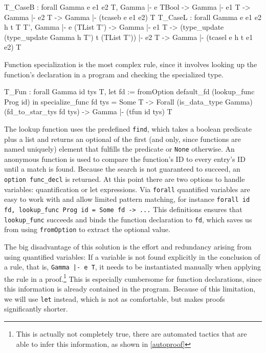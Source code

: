 \documentclass[fleqn]{scrreprt}
\newcommand{\coqinline}[1]{\texttt{#1}}
\begin{document}
\begin{coqcode}
T_CaseB : forall Gamma e e1 e2 T,
            Gamma |- e \in TBool -> Gamma |- e1 \in T -> Gamma |- e2 \in T ->
            Gamma |- (tcaseb e e1 e2) \in T
T_CaseL : forall Gamma e e1 e2 h t T T',
            Gamma |- e \in (TList T') -> Gamma |- e1 \in T ->
            (type_update (type_update Gamma h T') t (TList T')) |- e2 \in T ->
            Gamma |- (tcasel e h t e1 e2) \in T
\end{coqcode}
Function specialization is the most complex rule, since it involves looking up the function's declaration in a program and checking the specialized type.
\begin{coqcode}
T_Fun : forall Gamma id tys T,
          let fd := fromOption default_fd (lookup_func Prog id) in 
          specialize_func fd tys = Some T ->
          Forall (is_data_type Gamma) (fd_to_star_tys fd tys) ->
          Gamma |- (tfun id tys) \in T
\end{coqcode}
The lookup function uses the predefined \coqinline{find}, which takes a boolean predicate plus a list and returns an optional of the first (and only, since functions are named uniquely) element that fulfills the predicate or \coqinline{None} otherwise. An anonymous function is used to compare the function's ID to every entry's ID until a match is found. Because the search is not guaranteed to succeed, an \coqinline{option func_decl} is returned. At this point there are two options to handle variables: quantification or let expressions. Via \coqinline{forall} quantified variables are easy to work with and allow limited pattern matching, for instance \coqinline{forall id fd, lookup_func Prog id = Some fd -> ...} This definitions ensures that \coqinline{lookup_func} succeeds and binds the function declaration to \coqinline{fd}, which saves us from using \coqinline{fromOption} to extract the optional value.
\par
 The big disadvantage of this solution is the effort and redundancy arising from using quantified variables: If a variable is not found explicitly in the conclusion of a rule, that is, \coqinline{Gamma |- e \in T}, it needs to be instantiated manually when applying the rule in a proof.\footnote{This is actually not completely true, there are automated tactics that are able to infer this information, as shown in \autoref{autoproof}} This is especially cumbersome for function declarations, since this information is already contained in the program. Because of this limitation, we will use \coqinline{let} instead, which is not as comfortable, but makes proofs significantly shorter.
\end{document}
